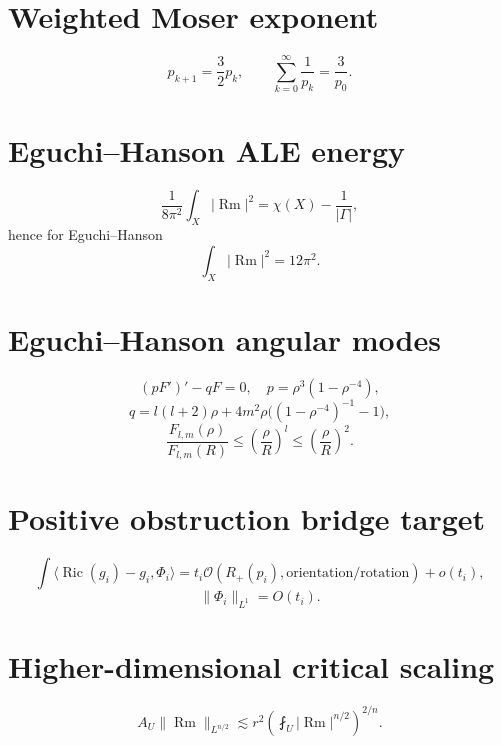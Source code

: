 \documentclass[11pt]{article}
\begin{document}
\section*{Weighted Moser exponent}
\[
p_{k+1}=\frac32p_k,
\qquad
\sum_{k=0}^\infty\frac1{p_k}=\frac3{p_0}.
\]

\section*{Eguchi--Hanson ALE energy}
\[
\frac1{8\pi^2}\int_X|\operatorname{Rm}|^2
=
\chi(X)-\frac1{|\Gamma|},
\]
hence for Eguchi--Hanson
\[
\int_X|\operatorname{Rm}|^2=12\pi^2.
\]

\section*{Eguchi--Hanson angular modes}
\[
(pF')'-qF=0,
\quad
p=\rho^3(1-\rho^{-4}),
\]
\[
q=l(l+2)\rho+
4m^2\rho\bigl((1-\rho^{-4})^{-1}-1\bigr),
\]
\[
\frac{F_{l,m}(\rho)}{F_{l,m}(R)}
\le
\left(\frac{\rho}{R}\right)^l
\le
\left(\frac{\rho}{R}\right)^2.
\]

\section*{Positive obstruction bridge target}
\[
\int\langle\operatorname{Ric}(g_i)-g_i,\Phi_i\rangle
=
t_i\mathcal O(R_+(p_i),\mathrm{orientation/rotation})
+o(t_i),
\]
\[
\|\Phi_i\|_{L^1}=O(t_i).
\]

\section*{Higher-dimensional critical scaling}
\[
A_U\|\operatorname{Rm}\|_{L^{n/2}}
\lesssim
r^2
\left(
\fint_U|\operatorname{Rm}|^{n/2}
\right)^{2/n}.
\]
\end{document}

